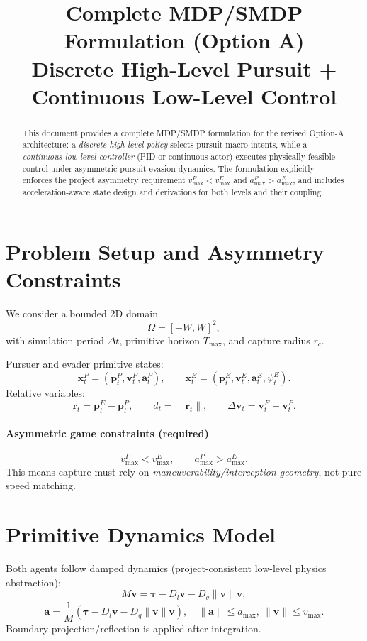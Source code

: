 \documentclass[11pt]{article}
\title{Complete MDP/SMDP Formulation (Option A)\\
Discrete High-Level Pursuit + Continuous Low-Level Control}
\author{}
\date{}
\begin{document}
\maketitle

\begin{abstract}
This document provides a complete MDP/SMDP formulation for the revised Option-A architecture: a \emph{discrete high-level policy} selects pursuit macro-intents, while a \emph{continuous low-level controller} (PID or continuous actor) executes physically feasible control under asymmetric pursuit-evasion dynamics. The formulation explicitly enforces the project asymmetry requirement \(v^P_{\max}<v^E_{\max}\) and \(a^P_{\max}>a^E_{\max}\), and includes acceleration-aware state design and derivations for both levels and their coupling.
\end{abstract}

\section{Problem Setup and Asymmetry Constraints}

We consider a bounded 2D domain
\[
\Omega=[-W,W]^2,
\]
with simulation period \(\Delta t\), primitive horizon \(T_{\max}\), and capture radius \(r_c\).

Pursuer and evader primitive states:
\[
\bm{x}^P_t=(\bm{p}^P_t,\bm{v}^P_t,\bm{a}^P_t),\qquad
\bm{x}^E_t=(\bm{p}^E_t,\bm{v}^E_t,\bm{a}^E_t,\psi^E_t).
\]
Relative variables:
\[
\bm{r}_t=\bm{p}^E_t-\bm{p}^P_t,\qquad d_t=\|\bm{r}_t\|,
\qquad \Delta\bm{v}_t=\bm{v}^E_t-\bm{v}^P_t.
\]

\paragraph{Asymmetric game constraints (required)}
\begin{equation}
v^P_{\max}<v^E_{\max},
\qquad
a^P_{\max}>a^E_{\max}.
\label{eq:asym}
\end{equation}
This means capture must rely on \emph{maneuverability/interception geometry}, not pure speed matching.

\section{Primitive Dynamics Model}
Both agents follow damped dynamics (project-consistent low-level physics abstraction):
\begin{equation}
M\dot{\bm{v}} = \bm{\tau} - D_l\bm{v} - D_q\|\bm{v}\|\bm{v},
\end{equation}
\begin{equation}
\bm{a}=\frac{1}{M}\left(\bm{\tau}-D_l\bm{v}-D_q\|\bm{v}\|\bm{v}\right),
\quad
\|\bm{a}\|\le a_{\max},\ \|\bm{v}\|\le v_{\max}.
\end{equation}
Boundary projection/reflection is applied after integration.
\end{document}
